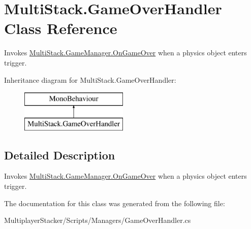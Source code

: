 \hypertarget{class_multi_stack_1_1_game_over_handler}{}\section{Multi\+Stack.\+Game\+Over\+Handler Class Reference}
\label{class_multi_stack_1_1_game_over_handler}


Invokes \hyperlink{class_multi_stack_1_1_game_manager_a8c599ec14abfba5712e9631a00d4ec59}{Multi\+Stack.\+Game\+Manager.\+On\+Game\+Over} when a physics object enters trigger.  


Inheritance diagram for Multi\+Stack.\+Game\+Over\+Handler\+:\begin{figure}[H]
\begin{center}
\leavevmode
\includegraphics[height=2.000000cm]{class_multi_stack_1_1_game_over_handler}
\end{center}
\end{figure}


\subsection{Detailed Description}
Invokes \hyperlink{class_multi_stack_1_1_game_manager_a8c599ec14abfba5712e9631a00d4ec59}{Multi\+Stack.\+Game\+Manager.\+On\+Game\+Over} when a physics object enters trigger. 



The documentation for this class was generated from the following file\+:\begin{DoxyCompactItemize}
\item 
Multiplayer\+Stacker/\+Scripts/\+Managers/Game\+Over\+Handler.\+cs\end{DoxyCompactItemize}
